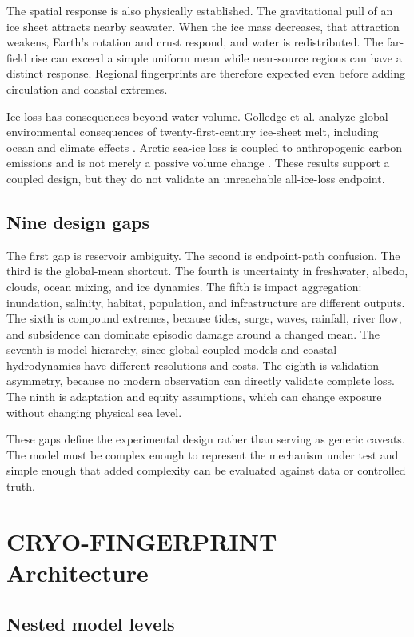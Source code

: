 \documentclass[conference]{IEEEtran}
\begin{document}
The spatial response is also physically established. The gravitational pull of an ice sheet attracts nearby seawater. When the ice mass decreases, that attraction weakens, Earth's rotation and crust respond, and water is redistributed. The far-field rise can exceed a simple uniform mean while near-source regions can have a distinct response. Regional fingerprints are therefore expected even before adding circulation and coastal extremes.

Ice loss has consequences beyond water volume. Golledge et al. analyze global environmental consequences of twenty-first-century ice-sheet melt, including ocean and climate effects \cite{golledge}. Arctic sea-ice loss is coupled to anthropogenic carbon emissions and is not merely a passive volume change \cite{notz}. These results support a coupled design, but they do not validate an unreachable all-ice-loss endpoint.

\subsection{Nine design gaps}

The first gap is reservoir ambiguity. The second is endpoint-path confusion. The third is the global-mean shortcut. The fourth is uncertainty in freshwater, albedo, clouds, ocean mixing, and ice dynamics. The fifth is impact aggregation: inundation, salinity, habitat, population, and infrastructure are different outputs. The sixth is compound extremes, because tides, surge, waves, rainfall, river flow, and subsidence can dominate episodic damage around a changed mean. The seventh is model hierarchy, since global coupled models and coastal hydrodynamics have different resolutions and costs. The eighth is validation asymmetry, because no modern observation can directly validate complete loss. The ninth is adaptation and equity assumptions, which can change exposure without changing physical sea level.

These gaps define the experimental design rather than serving as generic caveats. The model must be complex enough to represent the mechanism under test and simple enough that added complexity can be evaluated against data or controlled truth.

\section{CRYO-FINGERPRINT Architecture}

\subsection{Nested model levels}
\end{document}
